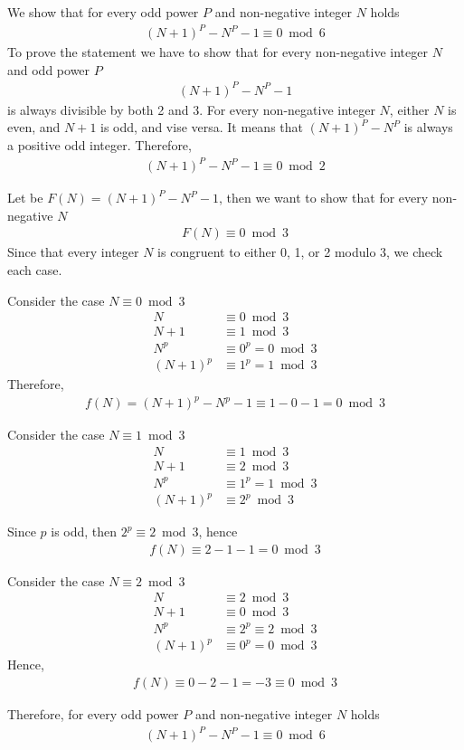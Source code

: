 We show that for every odd power $P$ and non-negative integer $N$ holds
\begin{align*}
    (N+1)^P - N^P - 1 \equiv 0 \bmod{6}
\end{align*}
To prove the statement we have to show that for every non-negative integer $N$ and odd power $P$
\begin{align*}
    (N+1)^P - N^P - 1
\end{align*}
is always divisible by both 2 and 3.
For every non-negative integer $N$, either $N$ is even, and $N+1$ is odd, and vise versa.
It means that $(N+1)^P - N^P$ is always a positive odd integer.
Therefore,
\begin{align*}
    (N+1)^P - N^P - 1 \equiv 0 \bmod{2}
\end{align*}

Let be $F(N) = (N+1)^P - N^P - 1$, then we want to show that for every non-negative $N$
\begin{align*}
    F(N) \equiv 0 \bmod{3}
\end{align*}
Since that every integer $N$ is congruent to either 0, 1, or 2 modulo 3, we check each case.

Consider the case $N \equiv 0 \bmod 3$
\begin{align*}
    N &\equiv 0 \bmod 3 \\
    N+1 &\equiv 1 \bmod 3 \\
    N^p &\equiv 0^p = 0 \bmod 3 \\
    (N+1)^p &\equiv 1^p = 1 \bmod 3
\end{align*}
Therefore,
\begin{align*}
    f(N) = (N+1)^p - N^p - 1 \equiv 1 - 0 - 1 = 0 \bmod 3
\end{align*}

Consider the case $N \equiv 1 \bmod 3$
\begin{align*}
    N &\equiv 1 \bmod 3 \\
    N+1 &\equiv 2 \bmod 3 \\
    N^p &\equiv 1^p = 1 \bmod 3 \\
    (N+1)^p &\equiv 2^p \bmod 3
\end{align*}

Since $p$ is odd, then $2^p \equiv 2 \bmod 3$, hence
\begin{align*}
    f(N) \equiv 2 - 1 - 1 = 0 \bmod 3
\end{align*}

Consider the case  $N \equiv 2 \bmod 3$
\begin{align*}
    N &\equiv 2 \bmod 3 \\
    N+1 &\equiv 0 \bmod 3 \\
    N^p &\equiv 2^p \equiv 2 \bmod 3 \\
    (N+1)^p &\equiv 0^p = 0 \bmod 3
\end{align*}
Hence,
\begin{align*}
    f(N) \equiv 0 - 2 - 1 = -3 \equiv 0 \bmod 3
\end{align*}

Therefore, for every odd power $P$ and non-negative integer $N$ holds
\begin{align*}
(N+1)^P - N^P - 1 \equiv 0 \bmod{6}
\end{align*}
